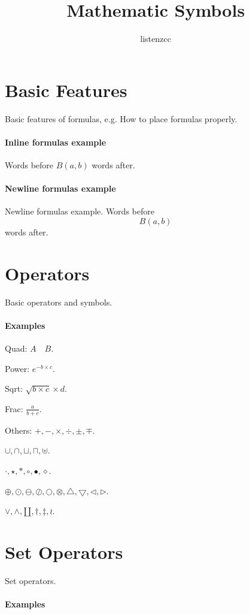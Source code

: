 \documentclass{article}[20200304]
\title{Mathematic Symbols}
\author{listenzcc}
\begin{document}
\maketitle

\section{Basic Features}
Basic features of formulas, e.g. How to place formulas properly.

\paragraph{Inline formulas example}
Words before \(B(a, b)\) words after.

\paragraph{Newline formulas example}
Newline formulas example. Words before \[B(a, b)\] words after.

\section{Operators}
Basic operators and symbols.

\paragraph{Examples}

Quad: \(A \quad B\).

Power: \(e^{-b \times c}\).

Sqrt: \(\sqrt{b \times c} \times d\).

Frac: \(\frac{a}{b + c}\).

Others: \(+, -, \times, \div, \pm, \mp\).

\(\cup, \cap, \sqcup, \sqcap, \uplus\).

\(\cdot, \star, \ast, \circ, \bullet, \diamond\).

\(\oplus, \odot, \ominus, \oslash, \bigcirc, \otimes, \bigtriangleup, \bigtriangledown, \triangleleft, \triangleright\).

\(\vee, \wedge, \amalg, \dagger, \ddagger, \wr\).

\section{Set Operators}
Set operators.

\paragraph{Examples}
\end{document}
